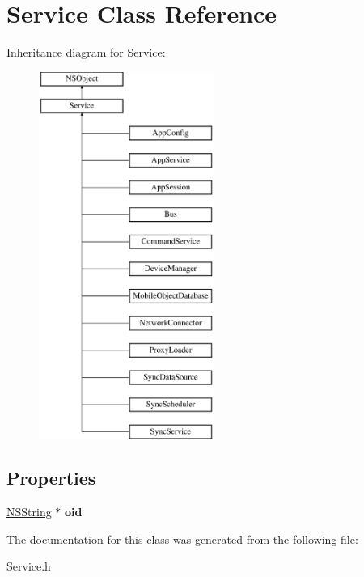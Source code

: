 \hypertarget{interface_service}{
\section{\-Service \-Class \-Reference}
\label{interface_service}
}
\-Inheritance diagram for \-Service\-:\begin{figure}[H]
\begin{center}
\leavevmode
\includegraphics[height=12.000000cm]{interface_service}
\end{center}
\end{figure}
\subsection*{\-Properties}
\begin{DoxyCompactItemize}
\item 
\hypertarget{interface_service_ab6290a3ae05b712a382ee07cbee0fd03}{
\hyperlink{class_n_s_string}{\-N\-S\-String} $\ast$ {\bfseries oid}}
\label{interface_service_ab6290a3ae05b712a382ee07cbee0fd03}

\end{DoxyCompactItemize}


\-The documentation for this class was generated from the following file\-:\begin{DoxyCompactItemize}
\item 
\-Service.\-h\end{DoxyCompactItemize}
